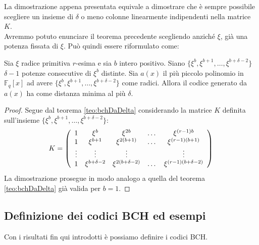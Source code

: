 \noindent
La dimostrazione appena presentata equivale a dimostrare che è sempre possibile scegliere un insieme di $\delta$ o meno colonne linearmente indipendenti nella matrice $K$. 
\\
Avremmo potuto enunciare il teorema precedente scegliendo anziché $\xi$, già una potenza fissata di $\xi$. Può quindi essere riformulato come:  
\begin{corollario}
   Sia $\xi$ radice primitiva $r$-esima e sia $b$ intero positivo. Siano $\lbrace \xi^{b}, \xi^{b+1}, \dots,\xi^{b + \delta -2} \rbrace $ $\delta -1$ potenze consecutive di $\xi^{b}$ distinte. Sia $a(x)$ il più piccolo polinomio in $\mathbb{F}_{q}[x]$ ad avere  $\lbrace \xi^{b}, \xi^{b+1}, \dots,\xi^{b + \delta -2} \rbrace $ come radici. Allora il codice generato da $a(x)$ ha come distanza minima al più $\delta$.
\end{corollario}
\begin{proof}
   Segue dal teorema \ref{teo:bchDaDelta} considerando la matrice $K$ definita sull'insieme $\lbrace \xi^{b}, \xi^{b+1}, \dots,\xi^{b + \delta -2} \rbrace $:
      \begin{align*}
        K =
 	\left(
 	\begin{array} {c c c c c}
 	1 & \xi^{b} & \xi^{2b} & \dots & \xi^{(r-1)b}   \\
        1 & \xi^{b+1} & \xi^{2(b+1)} & \dots & \xi^{(r-1)(b+1)}   \\
        \vdots & \vdots & \vdots &  & \vdots   \\
        1 & \xi^{b + \delta -  2}& \xi^{2( b+ \delta -  2)} & \dots & \xi^{(r-1)(b + \delta -  2)}         
 	\end{array}
 	\right)
     \end{align*} 
     La dimostrazione prosegue in modo analogo a quella del teorema \ref{teo:bchDaDelta} già valida per $b=1$.
\end{proof}


\subsection{Definizione dei codici BCH ed esempi}

Con i risultati fin qui introdotti è possiamo definire i codici BCH.

